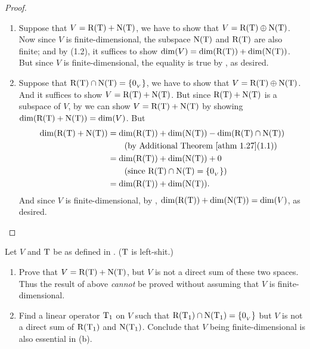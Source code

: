 \begin{proof} \ 
\begin{enumerate}
\item Suppose that \(V = \mathrm{R(T)} + \mathrm{N(T)}\), we have to show that \(V = \mathrm{R(T)} \oplus \mathrm{N(T)}\).
Now since \(V\) is finite-dimensional, the subspace \(\mathrm{N(T)}\) and \(\mathrm{R(T)}\) are also finite;
and by \ATHM{1.27}(1.2), it suffices to show \(\dim(V) = \dim(\mathrm{R(T)}) + \dim(\mathrm{N(T)})\).
But since \(V\) is finite-dimensional, the equality is true by \THM{2.3}, as desired.

\item Suppose that \(\mathrm{R(T)} \cap \mathrm{N(T)} = \{ 0_{_V} \}\), we have to show that \(V = \mathrm{R(T)} \oplus \mathrm{N(T)}\).
And it suffices to show \(V = \mathrm{R(T)} + \mathrm{N(T)}\).
But since \(\mathrm{R(T)} + \mathrm{N(T)}\) is a subspace of \(V\), by  we can show \(V = \mathrm{R(T)} + \mathrm{N(T)}\) by showing \(\dim(\mathrm{R(T)} + \mathrm{N(T)}) = \dim(V)\).
But
\begin{align*}
    \dim(\RANGET + \NULLT) & = \dim(\RANGET) + \dim(\NULLT) - \dim(\RANGET \cap \NULLT) \\
                           & \text{\ \ \ \ \ \ (by \ATHM{1.27}(1.1))} \\
                           & = \dim(\RANGET) + \dim(\NULLT) + 0 \\
                           & \text{\ \ \ \ \ \ (since \(\RANGET \cap \NULLT = \{ \OV \}\))} \\
                           & = \dim(\RANGET) + \dim(\NULLT).
\end{align*}
And since \(V\) is finite-dimensional, by , \(\dim(\mathrm{R(T)}) + \dim(\mathrm{N(T)}) = \dim(V)\), as desired.
\end{enumerate}
\end{proof}

\begin{exercise} \label{exercise 2.1.37}
Let \(V\) and \(\mathrm{T}\) be as defined in .
(\(\mathrm{T}\) is left-shit.)
\begin{enumerate}
\item Prove that \(V = \mathrm{R(T)} + \mathrm{N(T)}\), but \(V\) is not a direct sum of these two spaces.
    Thus the result of \EXEC{2.1.36} above \emph{cannot} be proved without assuming that \(V\) is finite-dimensional.
\item Find a linear operator \(\mathrm{T}_1\) on \(V\) such that \(\mathrm{R}(\mathrm{T}_1) \cap \mathrm{N}(\mathrm{T}_1) = \{ 0_{_V} \}\) but \(V\) is not a direct sum of \(\mathrm{R}(\mathrm{T}_1)\) and \(\mathrm{N}(\mathrm{T}_1)\).
    Conclude that \(V\) being finite-dimensional is also essential in \EXEC{2.1.36}(b).
\end{enumerate}
\end{exercise}

